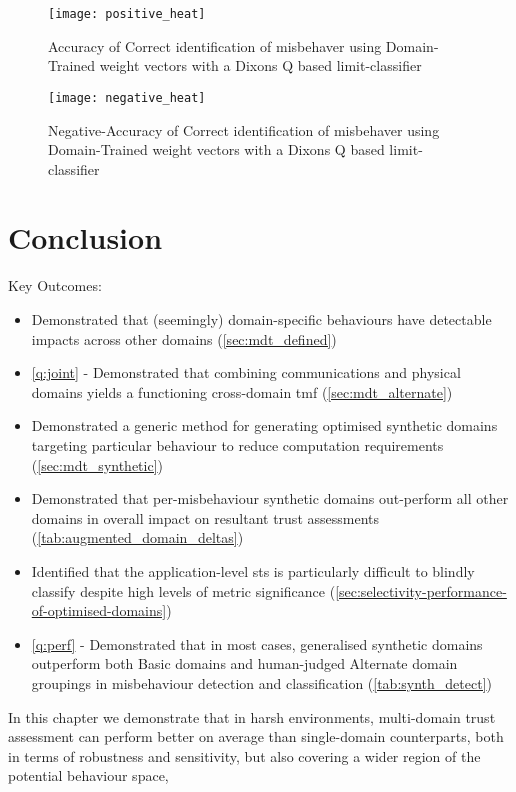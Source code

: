 \begin{figure}
	\centering
	\texttt{[image: positive\_heat]}
	\caption{Accuracy of Correct identification of misbehaver using Domain-Trained weight vectors with a Dixons Q based limit-classifier}
	\label{fig:positive_heat}
\end{figure}

\begin{figure}
	\centering
	\texttt{[image: negative\_heat]}
	\caption{Negative-Accuracy of Correct identification of misbehaver using Domain-Trained weight vectors with a Dixons Q based limit-classifier}
	\label{fig:negative_heat}
\end{figure}


\section{Conclusion}

Key Outcomes: 
\begin{itemize}
	\item Demonstrated that (seemingly) domain-specific behaviours have detectable impacts across other domains (\autoref{sec:mdt_defined})
	\item \autoref{q:joint} - Demonstrated that combining communications and physical domains yields a functioning cross-domain \gls{tmf} (\autoref{sec:mdt_alternate})
	\item Demonstrated a generic method for generating optimised synthetic domains targeting particular behaviour to reduce computation requirements (\autoref{sec:mdt_synthetic})
	\item Demonstrated that per-misbehaviour synthetic domains out-perform all other domains in overall impact on resultant trust assessments (\autoref{tab:augmented_domain_deltas})
	\item Identified that the application-level \gls{sts} is particularly difficult to blindly classify despite high levels of metric significance (\autoref{sec:selectivity-performance-of-optimised-domains})
	\item \autoref{q:perf} - Demonstrated that in most cases, generalised synthetic domains outperform both Basic domains and human-judged Alternate domain groupings in misbehaviour detection and classification (\autoref{tab:synth_detect})
\end{itemize}

In this chapter we demonstrate that in harsh environments, multi-domain trust assessment can perform better on average than single-domain counterparts, both in terms of robustness and sensitivity, but also covering a wider region of the potential behaviour space, 

